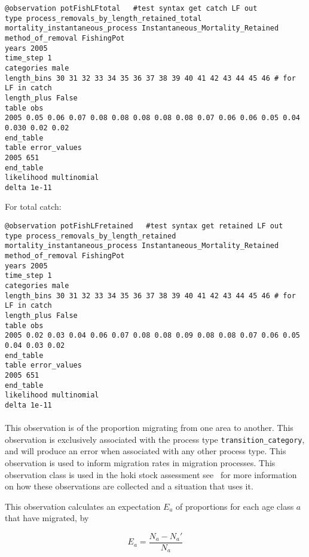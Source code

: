 \begin{itemize}
{\small{\begin{verbatim}
@observation potFishLFtotal   #test syntax get catch LF out
type process_removals_by_length_retained_total
mortality_instantaneous_process Instantaneous_Mortality_Retained
method_of_removal FishingPot
years 2005
time_step 1
categories male
length_bins 30 31 32 33 34 35 36 37 38 39 40 41 42 43 44 45 46 # for LF in catch
length_plus False
table obs
2005 0.05 0.06 0.07 0.08 0.08 0.08 0.08 0.08 0.07 0.06 0.06 0.05 0.04 0.030 0.02 0.02
end_table
table error_values
2005 651
end_table
likelihood multinomial
delta 1e-11
\end{verbatim}}}

For total catch:

{\small{\begin{verbatim}
@observation potFishLFretained   #test syntax get retained LF out
type process_removals_by_length_retained
mortality_instantaneous_process Instantaneous_Mortality_Retained
method_of_removal FishingPot
years 2005
time_step 1
categories male
length_bins 30 31 32 33 34 35 36 37 38 39 40 41 42 43 44 45 46 # for LF in catch
length_plus False
table obs
2005 0.02 0.03 0.04 0.06 0.07 0.08 0.08 0.09 0.08 0.08 0.07 0.06 0.05 0.04 0.03 0.02
end_table
table error_values
2005 651
end_table
likelihood multinomial
delta 1e-11
\end{verbatim}}}


\paragraph*{\label{sec:Proportions-migrating}}\label{sec:Observation-ProportionsMigrating}

This observation is of the proportion migrating from one area to another. This observation is exclusively associated with the process type \texttt{transition\_category}, and will produce an error when associated with any other process type. This observation is used to inform migration rates in migration processes. This observation class is used in the hoki stock assessment see~\cite{francis_03} for more information on how these observations are collected and a situation that uses it.

This observation calculates an expectation $E_a$ of proportions for each age class $a$ that have migrated, by

\begin{equation}
E_a = \frac{N_a - N_a'}{N_a}
\end{equation}


\end{itemize}
